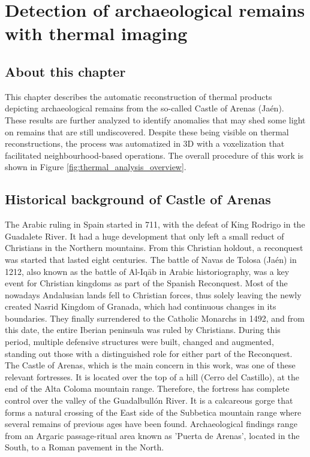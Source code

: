 \setchapterpreamble[u]{\margintoc}
\chapter{Detection of archaeological remains with thermal imaging}
\label{sec:castle_puerta_arenas}

\section*{About this chapter}

This chapter describes the automatic reconstruction of thermal products depicting archaeological remains from the so-called Castle of Arenas (Jaén). These results are further analyzed to identify anomalies that may shed some light on remains that are still undiscovered. Despite these being visible on thermal reconstructions, the process was automatized in 3D with a voxelization that facilitated neighbourhood-based operations. The overall procedure of this work is shown in Figure \ref{fig:thermal_analysis_overview}.

\section{Historical background of Castle of Arenas}

The Arabic ruling in Spain started in 711, with the defeat of King Rodrigo in the Guadalete River. It had a huge development that only left a small reduct of Christians in the Northern mountains. From this Christian holdout, a reconquest was started that lasted eight centuries. The battle of Navas de Tolosa (Jaén) in 1212, also known as the battle of Al-Iqāb in Arabic historiography, was a key event for Christian kingdoms as part of the Spanish Reconquest. Most of the nowadays Andalusian lands fell to Christian forces, thus solely leaving the newly created Nasrid Kingdom of Granada, which had continuous changes in its boundaries. They finally surrendered to the Catholic Monarchs in 1492, and from this date, the entire Iberian peninsula was ruled by Christians. During this period, multiple defensive structures were built, changed and augmented, standing out those with a distinguished role for either part of the Reconquest. The Castle of Arenas, which is the main concern in this work, was one of these relevant fortresses. It is located over the top of a hill (Cerro del Castillo), at the end of the Alta Coloma mountain range. Therefore, the fortress has complete control over the valley of the Guadalbullón River. It is a calcareous gorge that forms a natural crossing of the East side of the Subbetica mountain range where several remains of previous ages have been found. Archaeological findings range from an Argaric passage-ritual area known as 'Puerta de Arenas', located in the South, to a Roman pavement in the North.

